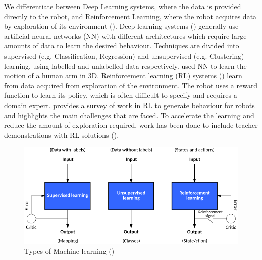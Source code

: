 We differentiate between Deep Learning systems, where the data is provided directly to the robot, and Reinforcement Learning, where the robot acquires data by exploration of its environment ().
Deep learning systems (\cite{schmidhuber2015deep}) generally use artificial neural networks (NN) with different architectures which require large amounts of data to learn the desired behaviour.
Techniques are divided into supervised (e.g. Classification, Regression) and unsupervised (e.g. Clustering) learning, using labelled and unlabelled data respectively.
\cite{billard2001robust} used NN to learn the motion of a human arm in 3D.
Reinforcement learning (RL) systems (\cite{sutton1998reinforcement,kaelbling1996reinforcement,gosavi2009reinforcement}) learn from data acquired from exploration of the environment. 
The robot uses a reward function to learn its policy, which is often difficult to specify and requires a domain expert.
\cite{kober2013reinforcement} provides a survey of work in RL to generate behaviour for robots and highlights the main challenges that are faced.
To accelerate the learning and reduce the amount of exploration required, work has been done to include teacher demonstrations with RL solutions (\cite{martinez2017relational,hester2017learning}).


\begin{figure}[ht]
	\centering
	\includegraphics[width=\linewidth]{figures/ml-techniques}
	\caption{Types of Machine learning (\cite{jones2017models})}
	\label{fig:ml-types}
\end{figure}

